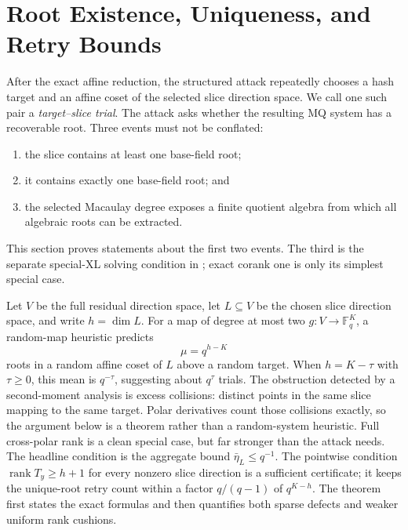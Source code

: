 \documentclass[11pt]{article}
\newcommand{\F}{\mathbb F}
\newcommand{\rank}{\operatorname{rank}}
\begin{document}
\section{Root Existence, Uniqueness, and Retry Bounds}\label{sec:slices}

After the exact affine reduction, the structured attack repeatedly chooses a
hash target and an affine coset of the selected slice direction space.  We call
one such pair a \emph{target--slice trial}.  The attack asks whether the
resulting MQ system has a recoverable root.  Three events must not be conflated:
\begin{enumerate}[label=(\roman*),itemsep=2pt]
\item the slice contains at least one base-field root;
\item it contains exactly one base-field root; and
\item the selected Macaulay degree exposes a finite quotient algebra from
      which all algebraic roots can be extracted.
\end{enumerate}
This section proves statements about the first two events.  The third is the
separate special-XL solving condition in ; exact corank
one is only its simplest special case.

Let $V$ be the full residual direction space, let $L\subseteq V$ be the chosen
slice direction space, and write $h=\dim L$.  For a map of degree at most two
$g:V\to\F_q^K$, a random-map heuristic predicts
\[
  \mu=q^{h-K}
\]
roots in a random affine coset of $L$ above a random target.  When $h=K-\tau$ with $\tau\ge0$, this mean is $q^{-\tau}$, suggesting
about $q^\tau$ trials.  The obstruction detected by a second-moment analysis is excess
collisions: distinct points in the same slice mapping to the same target.
Polar derivatives count those collisions exactly, so the argument below is a
theorem rather than a random-system heuristic.  Full cross-polar rank is a clean special case, but far stronger than the attack needs.  The
headline condition is the aggregate bound $\bar\eta_L\le q^{-1}$.
The pointwise condition $\rank T_y\ge h+1$ for every nonzero slice direction
is a sufficient certificate; it keeps the unique-root retry count
within a factor $q/(q-1)$ of $q^{K-h}$.  The theorem first states the exact formulas and
then quantifies both sparse defects and weaker uniform rank cushions.
\end{document}
